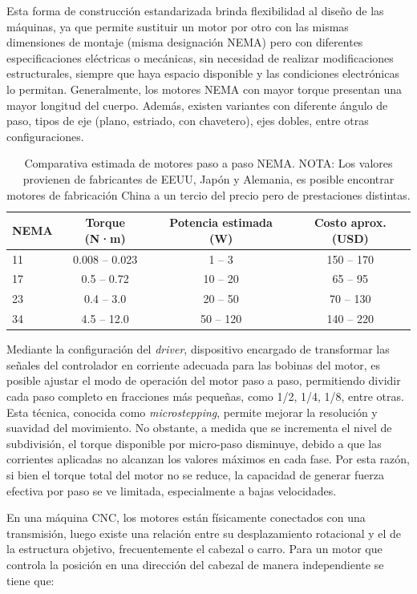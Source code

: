 Esta forma de construcción estandarizada brinda flexibilidad al diseño de las máquinas, ya que permite sustituir un motor por otro con las mismas dimensiones de montaje (misma designación NEMA) pero con diferentes especificaciones eléctricas o mecánicas, sin necesidad de realizar modificaciones estructurales, siempre que haya espacio disponible y las condiciones electrónicas lo permitan. Generalmente, los motores NEMA con mayor torque presentan una mayor longitud del cuerpo. Además, existen variantes con diferente ángulo de paso, tipos de eje (plano, estriado, con chavetero), ejes dobles, entre otras configuraciones.

\begin{table}[h]
\centering
\caption{Comparativa estimada de motores paso a paso NEMA. NOTA: Los valores provienen de fabricantes de EEUU, Japón y Alemania, es posible encontrar motores de fabricación China a un tercio del precio pero de prestaciones distintas.}
\label{tab:stepper_nema_comparison}
\begin{tabular}{lccc}
\toprule
\textbf{NEMA} & \textbf{Torque (N·m)} & \textbf{Potencia estimada (W)} & \textbf{Costo aprox. (USD)} \\
\midrule
11 & 0.008 – 0.023 & 1 – 3 & 150 – 170 \\
17 & 0.5 – 0.72 & 10 – 20 & 65 – 95 \\
23 & 0.4 – 3.0 & 20 – 50 & 70 – 130 \\
34 & 4.5 – 12.0 & 50 – 120 & 140 – 220 \\
\bottomrule
\end{tabular}
\end{table}

Mediante la configuración del \textit{driver}, dispositivo encargado de transformar las señales del controlador en corriente adecuada para las bobinas del motor, es posible ajustar el modo de operación del motor paso a paso, permitiendo dividir cada paso completo en fracciones más pequeñas, como 1/2, 1/4, 1/8, entre otras. Esta técnica, conocida como \textit{microstepping}, permite mejorar la resolución y suavidad del movimiento. No obstante, a medida que se incrementa el nivel de subdivisión, el torque disponible por micro-paso disminuye, debido a que las corrientes aplicadas no alcanzan los valores máximos en cada fase. Por esta razón, si bien el torque total del motor no se reduce, la capacidad de generar fuerza efectiva por paso se ve limitada, especialmente a bajas velocidades.

En una máquina CNC, los motores están físicamente conectados con una transmisión, luego existe una relación entre su desplazamiento rotacional y el de la estructura objetivo, frecuentemente el cabezal o carro. Para un motor que controla la posición en una dirección del cabezal de manera independiente se tiene que:

